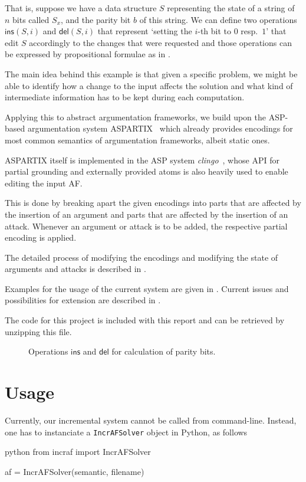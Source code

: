 \documentclass[oneside,12pt]{amsart}
\begin{document}
That is, suppose we have a data structure $S$ representing the state of a
string of $n$ bits called $S_x$, and the parity bit $b$ of this string.
We can define two operations $\mathsf{ins}(S,i)$ and $\mathsf{del}(S,i)$ 
that represent `setting the $i$-th bit to $0$ resp.\ $1$' that edit $S$ 
accordingly to the changes that were requested and those operations 
can be expressed by propositional formulae as in .

The main idea behind this example is that given a specific problem, we 
might be able to identify how a change to the input affects the solution 
and what kind of intermediate information has to be kept during each computation.

Applying this to abstract argumentation frameworks, we build upon the 
ASP-based argumentation system ASPARTIX~\cite{aspartix_website,aspartix} which already 
provides encodings for most common semantics of argumentation frameworks, albeit static ones.

ASPARTIX itself is implemented in the ASP system \emph{clingo}~\cite{clingo,potassco}, whose API 
for partial grounding and externally provided atoms is also heavily used 
to enable editing the input AF.

This is done by breaking apart the given encodings into parts that are affected
by the insertion of an argument and parts that are affected by the 
insertion of an attack. Whenever an argument or attack is to be added,
the respective partial encoding is applied. 

The detailed process of modifying the encodings and modifying 
the state of arguments and attacks is described in .

Examples for the usage of the current system are given in .
Current issues and possibilities for extension are described in .

The code for this project is included with this report and can be retrieved by
unzipping this file.

\begin{figure}
    
    \caption{Operations $\mathsf{ins}$ and $\mathsf{del}$ for calculation of parity bits.}
    \label{dynfo-parity}
\end{figure}

\section{Usage}\label{usage}
Currently, our incremental system cannot be called from command-line. Instead, one has to 
instanciate a \texttt{IncrAFSolver} object in Python, as follows
\begin{mintedbox}{python}
from incraf import IncrAFSolver

af = IncrAFSolver(semantic, filename)\end{mintedbox}
\end{document}
